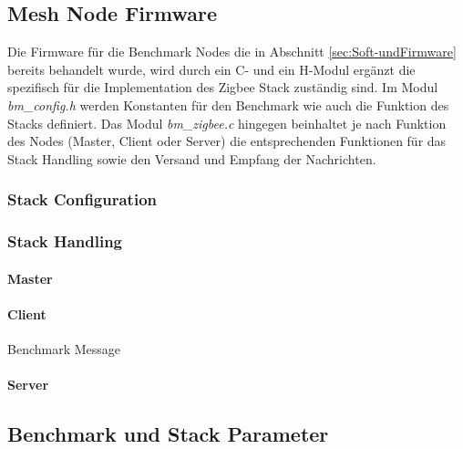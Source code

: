 \subsection{Mesh Node Firmware}\label{subsec:ZigbeeMeshNodeFirmware}
Die Firmware für die Benchmark Nodes die in Abschnitt \ref{sec:Soft-undFirmware} bereits behandelt wurde, wird durch ein C- und ein H-Modul ergänzt die spezifisch für die Implementation des Zigbee Stack zuständig sind.
Im Modul \textit{bm\_config.h} werden Konstanten für den Benchmark wie auch die Funktion des Stacks definiert.
Das Modul \textit{bm\_zigbee.c} hingegen beinhaltet je nach Funktion des Nodes (Master, Client oder Server) die entsprechenden Funktionen für das Stack Handling sowie den Versand und Empfang der Nachrichten.

\subsubsection{Stack Configuration}\label{subsubsec:ZigbeeStackConfiguration}


\subsubsection{Stack Handling}\label{subsubsec:ZigbeeStackHandling}


\paragraph{Master}\label{par:ZigbeeMaster}

\paragraph{Client}\label{par:ZigbeeClient}

Benchmark Message

\paragraph{Server}\label{par:ZigbeeServer}




\subsection{Benchmark und Stack Parameter}\label{subsec:BenchmarkundStackParameter}


